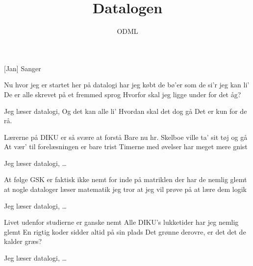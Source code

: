 \documentclass[a4paper,11pt]{article}
\title{Datalogen}
\author{ODML}
\begin{document}
\maketitle

\begin{roles}
[Jan] Sanger
\end{roles}

\begin{song}
   Nu hvor jeg er startet her på datalogi
            har jeg købt de bø'er som de si'r jeg kan li'
            De er alle skrevet på et fremmed sprog
            Hvorfor skal jeg ligge under for det åg?

   Jeg læser datalogi,
            Og det kan alle li'
            Hvordan skal det dog gå
            Det er kun for de rå.

   Lærerne på DIKU er så svære at forstå
            Bare nu hr. Skelboe ville ta' sit tøj og gå
            At vær' til forelæsningen er bare trist
            Timerne med øvelser har meget mere gnist

   Jeg læser datalogi, \ldots

   At følge GSK er faktisk ikke nemt
            for inde på matriklen der har de nemlig glemt
            at nogle dataloger læser matematik
            jeg tror at jeg vil prøve på at lære dem logik

   Jeg læser datalogi, \ldots

   Livet udenfor studierne er ganske nemt
            Alle DIKU's lukketider har jeg nemlig glemt
            En rigtig koder sidder altid på sin plads
            Det grønne derovre, er det det de kalder græs?

   Jeg læser datalogi, \ldots

\end{song}
\end{document}
